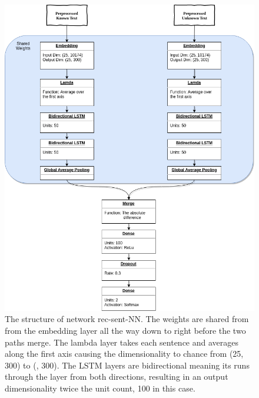 \begin{figure}
\centering
\includegraphics[width=\textwidth]{./pictures/experiments/rec_sent_nn/RNN_model.png}
\caption{The structure of network \gls{rec-sent-NN}. The weights are shared from
from the embedding layer all the way down to right before the two paths merge.
The lambda layer takes each sentence and averages along the first axis
causing the dimensionality to chance from (25, 300) to (, 300). The LSTM
layers are bidirectional meaning its runs through the layer from both directions,
resulting in an output dimensionality twice the unit count, 100 in this case.
\label{fig:rec-sent-NN}}
\end{figure}


